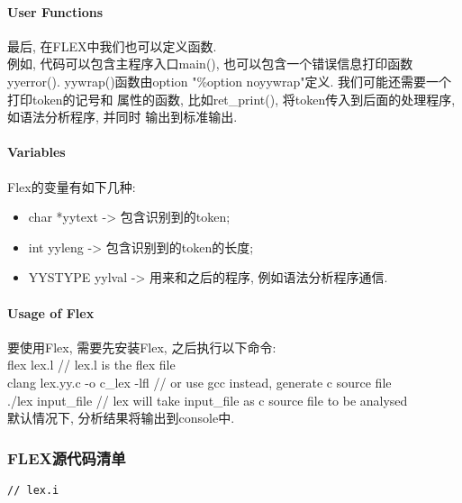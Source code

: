\paragraph{User Functions}
最后, 在FLEX中我们也可以定义函数. \\
例如, 代码可以包含主程序入口main(), 也可以包含一个错误信息打印函数yyerror().
yywrap()函数由option "\%option noyywrap"定义. 我们可能还需要一个打印token的记号和
属性的函数, 比如ret\_print(), 将token传入到后面的处理程序, 如语法分析程序, 并同时
输出到标准输出.

\paragraph{Variables}
Flex的变量有如下几种:
\begin{itemize}
	\item char *yytext -> 包含识别到的token;
	\item int yyleng -> 包含识别到的token的长度;
	\item YYSTYPE yylval -> 用来和之后的程序, 例如语法分析程序通信.
\end{itemize}

\paragraph{Usage of Flex}
要使用Flex, 需要先安装Flex, 之后执行以下命令: \\[0.5cm]
flex lex.l // lex.l is the flex file \\[0.5cm]
clang lex.yy.c -o c\_lex -lfl // or use gcc instead, generate c source file \\[0.5cm]
./lex input\_file // lex will take input\_file as c source file to be analysed \\[0.5cm]
默认情况下, 分析结果将输出到console中.

\subsubsection{FLEX源代码清单}
\begin{lstlisting}
// lex.i
\end{lstlisting}
% 
